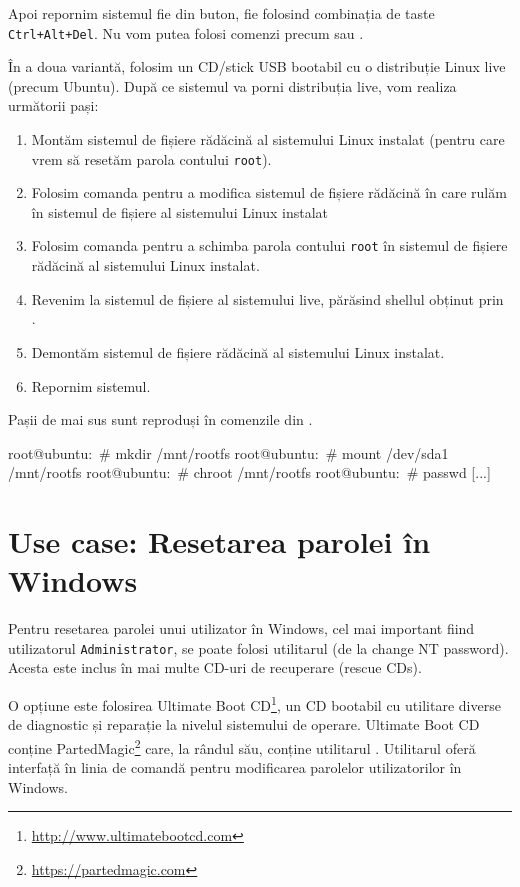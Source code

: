 Apoi repornim sistemul fie din buton, fie folosind combinația de taste
\texttt{Ctrl+Alt+Del}. Nu vom putea folosi comenzi precum  sau .

În a doua variantă, folosim un CD/stick USB bootabil cu o distribuție Linux live
(precum Ubuntu). După ce sistemul va porni distribuția live, vom realiza
următorii pași:

\begin{enumerate}
  \item Montăm sistemul de fișiere rădăcină al sistemului Linux instalat
    (pentru care vrem să resetăm parola contului \texttt{root}).
  \item Folosim comanda  pentru a modifica sistemul de fișiere
    rădăcină în care rulăm în sistemul de fișiere al sistemului
    Linux instalat
  \item Folosim comanda  pentru a schimba parola contului \texttt{root} în
    sistemul de fișiere rădăcină al sistemului Linux instalat.
  \item Revenim la sistemul de fișiere al sistemului live, părăsind
        shellul obținut prin .
  \item Demontăm sistemul de fișiere rădăcină al sistemului Linux
    instalat.
  \item Repornim sistemul.
\end{enumerate}

Pașii de mai sus sunt reproduși în comenzile din .

\begin{screen}[caption={Resetarea parolei contului root cu live CD},label={lst:user:pw-reset-live-cd}]
root@ubuntu:~# mkdir /mnt/rootfs
root@ubuntu:~# mount /dev/sda1 /mnt/rootfs
root@ubuntu:~# chroot /mnt/rootfs
root@ubuntu:~# passwd
[...]
\end{screen}

\section{Use case: Resetarea parolei în Windows}
\label{sec:user:windows-password-recovery}

Pentru resetarea parolei unui utilizator în Windows, cel mai important fiind
utilizatorul \texttt{Administrator}, se poate folosi utilitarul  (de la change NT
password). Acesta este inclus în mai multe CD-uri de recuperare (rescue CDs).

O opțiune este folosirea Ultimate Boot
CD\footnote{\url{http://www.ultimatebootcd.com}}, un CD bootabil cu utilitare
diverse de diagnostic și reparație la nivelul sistemului de operare. Ultimate
Boot CD conține PartedMagic\footnote{\url{https://partedmagic.com}} care, la
rândul său, conține utilitarul . Utilitarul  oferă interfață în
linia de comandă pentru modificarea parolelor utilizatorilor în Windows.

